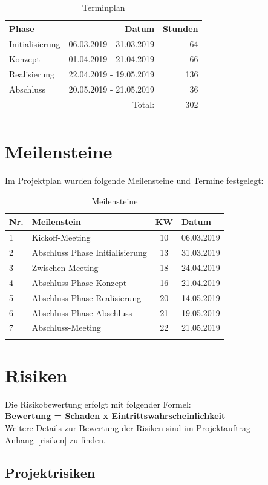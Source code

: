 \begin{longtable}[]{@{}lrr@{}}
  \toprule
  Phase           & Datum                   & Stunden\tabularnewline
  \midrule
  \endhead
  Initialisierung & 06.03.2019 - 31.03.2019 & 64\tabularnewline
  Konzept         & 01.04.2019 - 21.04.2019 & 66\tabularnewline
  Realisierung    & 22.04.2019 - 19.05.2019 & 136\tabularnewline
  Abschluss       & 20.05.2019 - 21.05.2019 & 36\tabularnewline
  \midrule
                  & Total:                  & 302\tabularnewline
  \bottomrule
  \caption{Terminplan}
\end{longtable}

\section{Meilensteine}\label{meilensteine}

Im Projektplan wurden folgende Meilensteine und Termine festgelegt:

\begin{longtable}[]{@{}llcl@{}}
  \toprule
  Nr. & Meilenstein                     & KW & Datum\tabularnewline
  \midrule
  \endhead
  1   & Kickoff-Meeting                 & 10 & 06.03.2019\tabularnewline
  2   & Abschluss Phase Initialisierung & 13 & 31.03.2019\tabularnewline
  3   & Zwischen-Meeting                & 18 & 24.04.2019\tabularnewline
  4   & Abschluss Phase Konzept         & 16 & 21.04.2019\tabularnewline
  5   & Abschluss Phase Realisierung    & 20 & 14.05.2019\tabularnewline
  6   & Abschluss Phase Abschluss       & 21 & 19.05.2019\tabularnewline
  7   & Abschluss-Meeting               & 22 & 21.05.2019\tabularnewline
  \bottomrule
  \caption{Meilensteine}
\end{longtable}

\clearpage
\section{Risiken}

Die Risikobewertung erfolgt mit folgender Formel:\\

\textbf{Bewertung = Schaden x Eintrittswahrscheinlichkeit}\\

\noindent{}Weitere Details zur Bewertung der Risiken sind im Projektauftrag Anhang~\ref{risiken} zu finden.

\subsection{Projektrisiken}\label{projektrisiken}

